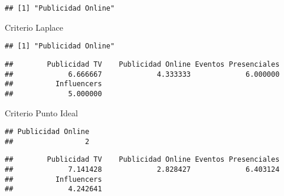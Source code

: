 \documentclass[
]{article}
\newenvironment{Shaded}{\begin{snugshade}}{\end{snugshade}}
\newcommand{\FunctionTok}[1]{\textcolor[rgb]{0.13,0.29,0.53}{\textbf{#1}}}
\newcommand{\NormalTok}[1]{#1}
\newcommand{\OtherTok}[1]{\textcolor[rgb]{0.56,0.35,0.01}{#1}}
\newcommand{\SpecialCharTok}[1]{\textcolor[rgb]{0.81,0.36,0.00}{\textbf{#1}}}
\begin{document}
\begin{verbatim}
## [1] "Publicidad Online"
\end{verbatim}

Criterio Laplace

\begin{Shaded}
\end{Shaded}

\begin{verbatim}
## [1] "Publicidad Online"
\end{verbatim}

\begin{Shaded}
\end{Shaded}

\begin{verbatim}
##        Publicidad TV    Publicidad Online Eventos Presenciales 
##             6.666667             4.333333             6.000000 
##          Influencers 
##             5.000000
\end{verbatim}

Criterio Punto Ideal

\begin{Shaded}
\end{Shaded}

\begin{verbatim}
## Publicidad Online 
##                 2
\end{verbatim}

\begin{Shaded}
\end{Shaded}

\begin{verbatim}
##        Publicidad TV    Publicidad Online Eventos Presenciales 
##             7.141428             2.828427             6.403124 
##          Influencers 
##             4.242641
\end{verbatim}
\end{document}
